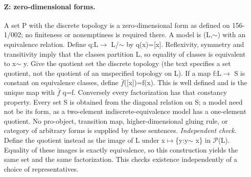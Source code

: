 \paragraph{Z: zero-dimensional forms.}\label{lem:zero}
A set P with the discrete topology is a zero-dimensional form as defined on 156-1/002; no finiteness or nonemptiness is required there. A model is (L,$\sim$) with an equivalence relation. Define q:L$\to$ L/{$\sim$} by q(x)=[x]. Reflexivity, symmetry and transitivity imply that the classes partition L, so equality of classes is equivalent to x$\sim$ y. Give the quotient set the discrete topology (the text specifies a set quotient, not the quotient of an unspecified topology on L). If a map f:L$\to$ S is constant on equivalence classes, define $\bar f$([x])=f(x). This is well defined and is the unique map with $\bar f$ q=f. Conversely every factorization has that constancy property. Every set S is obtained from the diagonal relation on S; a model need not be its form, as a two-element indiscrete-equivalence model has a one-element quotient. No pro-object, transition map, higher-dimensional gluing rule, or category of arbitrary forms is supplied by these sentences.
\emph{Independent check.} Define the quotient instead as the image of L under x$\mapsto$\{y:y$\sim$ x\} in $\mathcal P$(L). Equality of these images is exactly equivalence, so this construction yields the same set and the same factorization. This checks existence independently of a choice of representatives.

